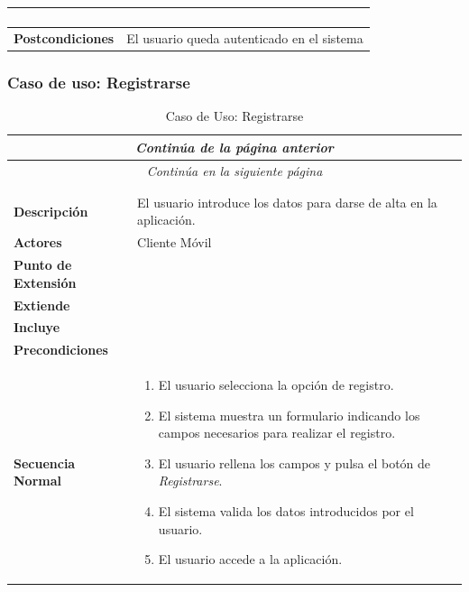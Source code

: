 \begin{longtable}{| p{4cm} | p{10cm} |}
\begin{enumerate}[leftmargin=0.9cm, topsep=0.1cm]
\end{enumerate}\\

\hline
\textbf{Postcondiciones} & 
El usuario queda autenticado en el sistema\\
\hline
\end{longtable}




\newpage
\subsubsection*{Caso de uso: Registrarse}
\begin{longtable}{| p{4cm} | p{10cm} |}
\endfirsthead
\multicolumn{2}{c}{\textit{Continúa de la página anterior}}\\[12pt]
\hline
\endhead
\hline
\multicolumn{2}{c}{\textit{Continúa en la siguiente página}} \\
\endfoot
\hline
\caption{Caso de Uso: Registrarse}\label{fig:1}\\
\endlastfoot


\hline
\multicolumn{2}{|c|}{\textbf{CU$<$02$>$ - Registrarse}} \\

\hline
\textbf{Descripción} &
El usuario introduce los datos para darse de alta en la aplicación. \\

\hline
\textbf{Actores} &
Cliente Móvil\\

\hline
\textbf{Punto de Extensión} &
\\

\hline
\textbf{Extiende} &
\\

\hline
\textbf{Incluye} &
\\

\hline
\textbf{Precondiciones} &
\\

\hline
\textbf{Secuencia Normal} &\mbox{}\par\vspace{-\baselineskip}
\begin{enumerate}[leftmargin=0.7cm, topsep=0.1cm]
\item El usuario selecciona la opción de registro.
\item El sistema muestra un formulario indicando los campos necesarios para realizar el registro.
\item El usuario rellena los campos y pulsa el botón de \textit{Registrarse}.
\item El sistema valida los datos introducidos por el usuario.
\item El usuario accede a la aplicación.
\end{enumerate}\\


\end{longtable}
